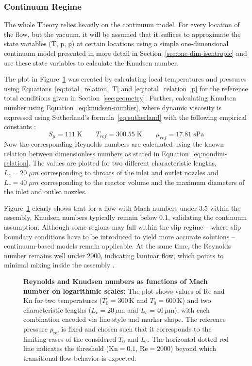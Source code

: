 \subsubsection*{Continuum Regime}
	The whole Theory relies heavily on the continuum model.
	For every location of the flow, but the vacuum, it will be assumed that it suffices to approximate the state variables (T, p, ρ) at certain locations using a simple one-dimensional continuum model presented in more detail in Section~\ref{sec:one-dim-isentropic} and use these state variables to calculate the Knudsen number.

	The plot in Figure~\ref{fig:knudsen-reynolds-plot} was created by calculating local temperatures and pressures using Equations~\eqref{eq:total_relation_T} and \eqref{eq:total_relation_p} for the reference total conditions given in Section~\ref{sec:geometry}.
	Further, calculating Knudsen number using Equation~\eqref{eq:knudsen-number}, where dynamic viscosity is expressed using Sutherland's formula~\eqref{eq:sutherland} with the following empirical constants \cite{kim2004numericalanalysisflowcharacteristics}:
	$$
		S_\mu = 111\;\text{K} \qquad T_{ref} = 300.55\;\text{K} \qquad \mu_{ref} = 17.81\; \text{sPa}
	$$
	Now the corresponding Reynolds numbers are calculated using the known relation between dimensionless numbers as stated in Equation~\eqref{eq:nondim-relation}.
	The values are plotted for two different characteristic lengths, $L_c = 20\;\mu m$ corresponding to throats of the inlet and outlet nozzles and $L_c = 40\;\mu m$ corresponding to the reactor volume and the maximum diameters of the inlet and outlet nozzles.

	Figure~\ref{fig:knudsen-reynolds-plot} clearly shows that for a flow with Mach numbers under 3.5 within the assembly, Knudsen numbers typically remain below 0.1, validating the continuum assumption.
	Although some regions may fall within the slip regime -- where slip boundary conditions have to be introduced to yield more accurate solutions -- continuum-based models remain applicable. 
	At the same time, the Reynolds number remains well under 2000, indicating laminar flow, which points to minimal mixing inside the assembly \cite{ames1953compressible, comsol_microfluidics_guide}.

	\begin{figure}[H]
		\centering
		
		\caption[Reynolds and Knudsen numbers as functions of Mach number on logarithmic scales.]{
			\textbf{Reynolds and Knudsen numbers as functions of Mach number on logarithmic scales:}
			The plot shows values of $\mathrm{Re}$ and $\mathrm{Kn}$ for two temperatures ($T_0 = 300\,\mathrm{K}$ and $T_0 = 600\,\mathrm{K}$) and two characteristic lengths ($L_c = 20\,\mu\mathrm{m}$ and $L_c = 40\,\mu\mathrm{m}$), with each combination encoded via line style and marker shape.
			The reference pressure $p_\mathrm{ref}$ is fixed and chosen such that it corresponds to the limiting cases of the considered $T_0$ and $L_c$.
			The horizontal dotted red line indicates the threshold ($\mathrm{Kn} = 0.1$, $\mathrm{Re} = 2000$) beyond which transitional flow behavior is expected.
		}
		\label{fig:knudsen-reynolds-plot}
	\end{figure}

